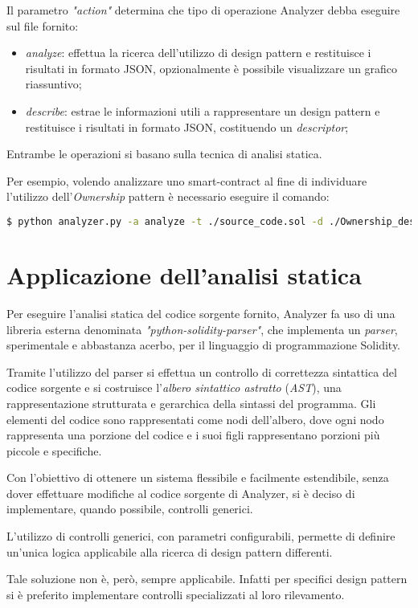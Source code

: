 \noindent Il parametro \textit{"action"} determina che tipo di operazione Analyzer debba eseguire sul file fornito:
\begin{itemize}
	\item \textit{analyze}: effettua la ricerca dell'utilizzo di design pattern e restituisce i risultati in formato JSON, opzionalmente è possibile visualizzare un grafico riassuntivo;
	\item \textit{describe}: estrae le informazioni utili a rappresentare un design pattern e restituisce i risultati in formato JSON, costituendo un \textit{descriptor};
\end{itemize}
Entrambe le operazioni si basano sulla tecnica di analisi statica.\par
Per esempio, volendo analizzare uno smart-contract al fine di individuare l'utilizzo dell'\textit{Ownership} pattern è necessario eseguire il comando:
\begin{lstlisting}[language=bash]
	$ python analyzer.py -a analyze -t ./source_code.sol -d ./Ownership_descriptor.json
\end{lstlisting}

\section{Applicazione dell'analisi statica}
Per eseguire l'analisi statica del codice sorgente fornito, Analyzer fa uso di una libreria esterna denominata \textit{"python-solidity-parser"}, che implementa un \textit{parser}, sperimentale e abbastanza acerbo, per il linguaggio di programmazione Solidity.\par
Tramite l'utilizzo del parser si effettua un controllo di correttezza sintattica del codice sorgente e si costruisce l'\textit{albero sintattico astratto} (\textit{AST}), una rappresentazione strutturata e gerarchica della sintassi del programma. Gli elementi del codice sono rappresentati come nodi dell'albero, dove ogni nodo rappresenta una porzione del codice e i suoi figli rappresentano porzioni più piccole e specifiche.
\newline

\noindent Con l'obiettivo di ottenere un sistema flessibile e facilmente estendibile, senza dover effettuare modifiche al codice sorgente di Analyzer, si è deciso di implementare, quando possibile, controlli generici.\par
L'utilizzo di controlli generici, con parametri configurabili, permette di definire un'unica logica applicabile alla ricerca di design pattern differenti.\par
Tale soluzione non è, però, sempre applicabile. Infatti per specifici design pattern si è preferito implementare controlli specializzati al loro rilevamento.

